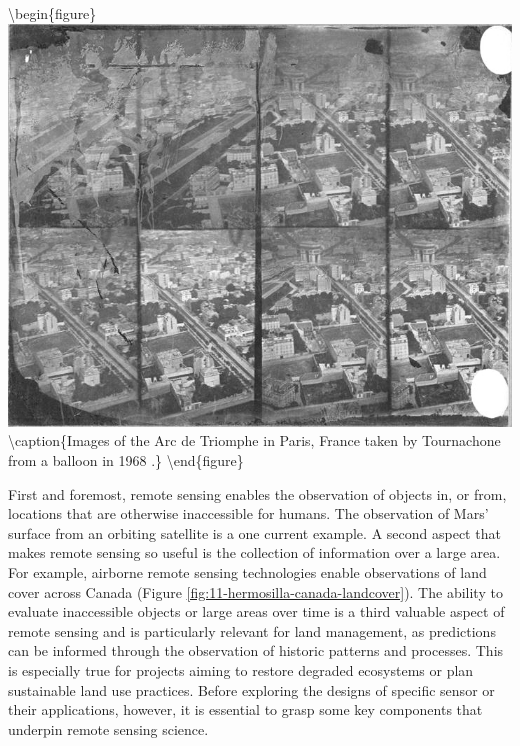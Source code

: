 \documentclass[
]{book}
\begin{document}
\textbackslash begin\{figure\}
\includegraphics[width=0.75\linewidth]{images/11-nadar-triomphe-1868} \textbackslash caption\{Images of the Arc de Triomphe in Paris, France taken by Tournachone from a balloon in 1968 \citep{nadar_arc_1868}.\}\label{fig:11-nadar}
\textbackslash end\{figure\}

First and foremost, remote sensing enables the observation of objects
in, or from, locations that are otherwise inaccessible for humans. The
observation of Mars' surface from an orbiting satellite is a one current
example. A second aspect that makes remote sensing so useful is the
collection of information over a large area. For example, airborne
remote sensing technologies enable observations of land cover across
Canada (Figure \ref{fig:11-hermosilla-canada-landcover}). The ability
to evaluate inaccessible objects or large areas over time is a third
valuable aspect of remote sensing and is particularly relevant for land
management, as predictions can be informed through the observation of
historic patterns and processes. This is especially true for projects
aiming to restore degraded ecosystems or plan sustainable land use
practices. Before exploring the designs of specific sensor or their
applications, however, it is essential to grasp some key components that
underpin remote sensing science.
\end{document}
